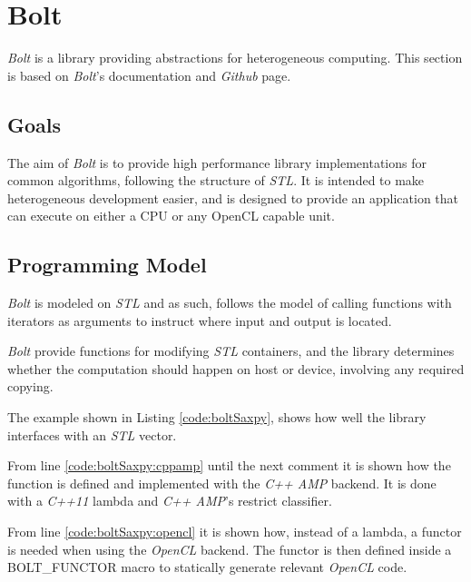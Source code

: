 \section{Bolt} \label{cha:boltRelWorks}
\textit{Bolt} is a library providing abstractions for heterogeneous computing. This section is based on \textit{Bolt}'s documentation\cite{boltDoc} and \textit{Github} page\cite{boltGithub}.

\subsection{Goals}
The aim of \textit{Bolt} is to provide high performance library implementations for common algorithms, following the structure of \textit{STL}. It is intended to make heterogeneous development easier, and is designed to provide an application that can execute on either a CPU or any OpenCL capable unit.

\subsection{Programming Model}
\textit{Bolt} is modeled on \textit{STL} and as such, follows the model of calling functions with iterators as arguments to instruct where input and output is located.

\textit{Bolt} provide functions for modifying \textit{STL} containers, and the library determines whether the computation should happen on host or device, involving any required copying.

The example shown in Listing \ref{code:boltSaxpy}, shows how well the library interfaces with an \textit{STL} vector.

From line \ref{code:boltSaxpy:cppamp} until the next comment it is shown how the function is defined and implemented with the \textit{C++ AMP} backend. It is done with a \textit{C++11} lambda and \textit{C++ AMP}'s restrict classifier.

From line \ref{code:boltSaxpy:opencl} it is shown how, instead of a lambda, a functor is needed when using the \textit{OpenCL} backend. The functor is then defined inside a BOLT\_FUNCTOR macro to statically generate relevant \textit{OpenCL} code.

